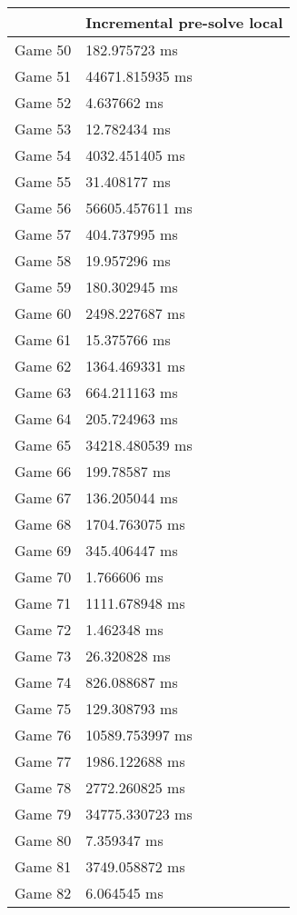 \begin{tabular}{|l|l|}
	\hline
	& Incremental pre-solve local \\ \hline
	Game 50 & 182.975723 ms \\ \hline
	Game 51 & 44671.815935 ms \\ \hline
	Game 52 & 4.637662 ms \\ \hline
	Game 53 & 12.782434 ms \\ \hline
	Game 54 & 4032.451405 ms \\ \hline
	Game 55 & 31.408177 ms \\ \hline
	Game 56 & 56605.457611 ms \\ \hline
	Game 57 & 404.737995 ms \\ \hline
	Game 58 & 19.957296 ms \\ \hline
	Game 59 & 180.302945 ms \\ \hline
	Game 60 & 2498.227687 ms \\ \hline
	Game 61 & 15.375766 ms \\ \hline
	Game 62 & 1364.469331 ms \\ \hline
	Game 63 & 664.211163 ms \\ \hline
	Game 64 & 205.724963 ms \\ \hline
	Game 65 & 34218.480539 ms \\ \hline
	Game 66 & 199.78587 ms \\ \hline
	Game 67 & 136.205044 ms \\ \hline
	Game 68 & 1704.763075 ms \\ \hline
	Game 69 & 345.406447 ms \\ \hline
	Game 70 & 1.766606 ms \\ \hline
	Game 71 & 1111.678948 ms \\ \hline
	Game 72 & 1.462348 ms \\ \hline
	Game 73 & 26.320828 ms \\ \hline
	Game 74 & 826.088687 ms \\ \hline
	Game 75 & 129.308793 ms \\ \hline
	Game 76 & 10589.753997 ms \\ \hline
	Game 77 & 1986.122688 ms \\ \hline
	Game 78 & 2772.260825 ms \\ \hline
	Game 79 & 34775.330723 ms \\ \hline
	Game 80 & 7.359347 ms \\ \hline
	Game 81 & 3749.058872 ms \\ \hline
	Game 82 & 6.064545 ms \\ \hline

\end{tabular}
